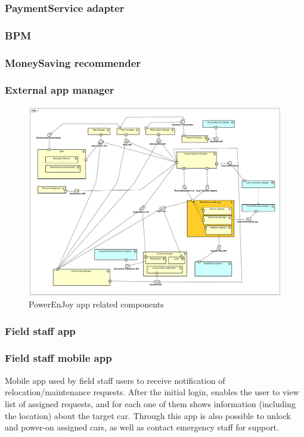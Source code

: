 \documentclass[english]{article}
\begin{document}
	\subsubsection{PaymentService adapter}
	
	\subsubsection{BPM}
		\subsubsection{MoneySaving recommender }
	
	\subsubsection{External app manager}
	
	\begin{figure}[H]
		\centering
		\includegraphics[scale=0.24]{./ComponentDiagrams/PowerEnjoyuser.pdf}%
		\caption{PowerEnJoy app related components}
	\end{figure}
	
	
\subsubsection*{Field staff app}
	
	\subsubsection{Field staff mobile app}
	Mobile app used by field staff users to receive notification of relocation/maintenance requests. After the initial login, enables the user to view list of assigned requests, and for each one of them shows information (including the location) about the target car. Through this app is also possible to unlock and power-on assigned cars, as well as contact emergency staff for support.
\end{document}
